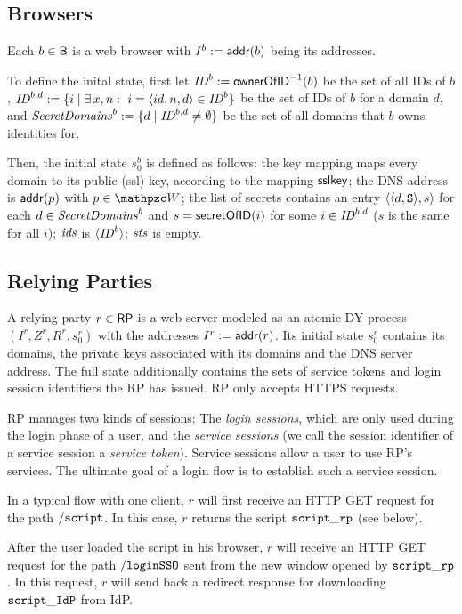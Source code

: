 \documentclass[letterpaper,onecolumn,10pt]{article}
\begin{document}
\subsection{Browsers}\label{app:browsers-uppresso} 
Each $b \in \mathsf{B}$ is a web browser with $I^b := \mathsf{addr}(b)$ being its addresses.

To define the inital state, first let $\mathit{ID}^b := \mathsf{ownerOfID}^{-1}(b)$ be 
the set of all IDs of $b$, $\mathit{ID}^{b,d} := 
\{i \mid \exists\, x,n:\ i = \langle id, n, d\rangle \in \mathit{ID}^b\}$ be the set of
IDs of $b$ for a domain $d$, and $\mathit{SecretDomains}^b := \{d \mid
\mathit{ID}^{b,d} \neq \emptyset \}$ be the set of all domains that $b$
owns identities for.

Then, the initial state $s_0^b$ is defined as follows: the key mapping
maps every domain to its public (ssl) key, according to the mapping
$\mathsf{sslkey}$; the DNS address is $\mathsf{addr}(p)$ with $p \in \bidsystem$;
the list of secrets contains an entry $\langle\langle d,\mathtt{S}\rangle, s\rangle$ for each
$d \in \mathit{SecretDomains}^b$ and $s = \mathsf{secretOfID}(i)$ for some $i \in
\mathit{ID}^{b,d}$ ($s$ is the same for all $i$); $\mathit{ids}$ is
$\langle\mathit{ID}^b\rangle$; $\mathit{sts}$ is empty.

\subsection{Relying Parties} \label{app:relying-parties-uppresso}

A relying party $r \in \mathsf{RP}$ is a web server modeled as an atomic
DY process $(I^r, Z^r, R^r, s^r_0)$ with the addresses $I^r :=
\mathsf{addr}(r)$. Its initial state $s^r_0$ contains its domains,
the private keys associated with its domains and the DNS server address.
The full state additionally contains the sets of service tokens and login 
session identifiers the RP has issued. RP only accepts HTTPS requests.

RP manages two kinds of sessions: The \emph{login sessions}, which are
only used during the login phase of a user, and the \emph{service
  sessions} (we call the session identifier of a service session a
\emph{service token}). Service sessions allow a user to use RP's
services. The ultimate goal of a login flow is to establish such a
service session.

In a typical flow with one client, $r$ will first receive an HTTP GET
request for the path $\mathtt{/script}$. In this case, $r$ returns the script
$\mathtt{script\_rp}$ (see below).

After the user loaded the script in his browser, $r$ will receive an 
HTTP GET request for the path $\mathtt{/loginSSO}$ sent from the new window opened
by $\mathtt{script\_rp}$. In this request, $r$ will send back a redirect response  
for downloading $\mathtt{script\_IdP}$ from IdP.
\end{document}
